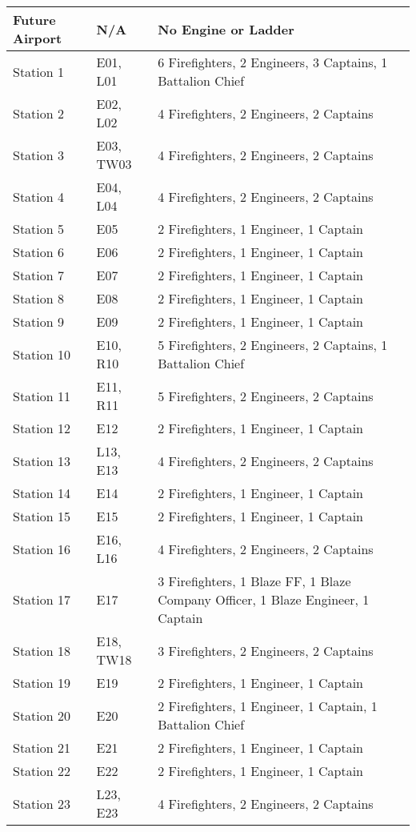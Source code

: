 \begin{longtable}{p{} p{} p{}}
    Future Airport & N/A & No Engine or Ladder \\
    \midrule
    Station 1 & E01, L01 & 6 Firefighters, 2 Engineers, 3 Captains, 1 Battalion Chief \\
    Station 2 & E02, L02 & 4 Firefighters, 2 Engineers, 2 Captains \\
    Station 3 & E03, TW03 & 4 Firefighters, 2 Engineers, 2 Captains \\
    Station 4 & E04, L04 & 4 Firefighters, 2 Engineers, 2 Captains \\
    Station 5 & E05 & 2 Firefighters, 1 Engineer, 1 Captain \\
    Station 6 & E06 & 2 Firefighters, 1 Engineer, 1 Captain \\
    Station 7 & E07 & 2 Firefighters, 1 Engineer, 1 Captain \\
    Station 8 & E08 & 2 Firefighters, 1 Engineer, 1 Captain \\
    Station 9 & E09 & 2 Firefighters, 1 Engineer, 1 Captain \\
    Station 10 & E10, R10 & 5 Firefighters, 2 Engineers, 2 Captains, 1 Battalion Chief \\
    Station 11 & E11, R11 & 5 Firefighters, 2 Engineers, 2 Captains \\
    Station 12 & E12 & 2 Firefighters, 1 Engineer, 1 Captain \\
    Station 13 & L13, E13 & 4 Firefighters, 2 Engineers, 2 Captains \\
    Station 14 & E14 & 2 Firefighters, 1 Engineer, 1 Captain \\
    Station 15 & E15 & 2 Firefighters, 1 Engineer, 1 Captain \\
    Station 16 & E16, L16 & 4 Firefighters, 2 Engineers, 2 Captains \\
    Station 17 & E17 & 3 Firefighters, 1 Blaze FF, 1 Blaze Company Officer, 1 Blaze Engineer, 1 Captain \\
    Station 18 & E18, TW18 & 3 Firefighters, 2 Engineers, 2 Captains \\
    Station 19 & E19 & 2 Firefighters, 1 Engineer, 1 Captain \\
    Station 20 & E20 & 2 Firefighters, 1 Engineer, 1 Captain, 1 Battalion Chief \\
    Station 21 & E21 & 2 Firefighters, 1 Engineer, 1 Captain \\
    Station 22 & E22 & 2 Firefighters, 1 Engineer, 1 Captain \\
    Station 23 & L23, E23 & 4 Firefighters, 2 Engineers, 2 Captains \\

\end{longtable}
